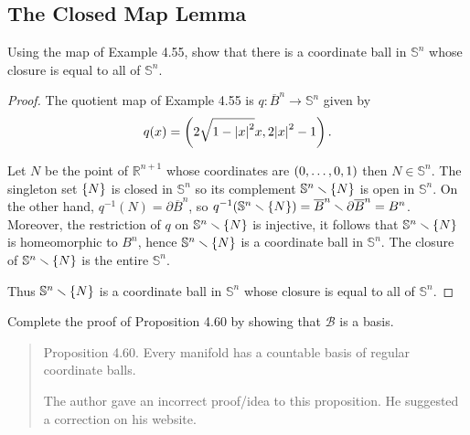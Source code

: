 \subsection*{The Closed Map Lemma}

\begin{exercise}{4.58}
	Using the map of Example 4.55, show that there is a coordinate ball in $\mathbb{S}^{n}$ whose closure is equal to all of $\mathbb{S}^{n}$.
\end{exercise}

\begin{proof}
	The quotient map of Example 4.55 is $q: {\overline{B}}^{n} \to \mathbb{S}^{n}$ given by
	\begin{equation*}
		q(x) = \left({2\sqrt{1 - {\left\vert{x}\right\vert}^{2}}x, 2{\left\vert{x}\right\vert}^{2} - 1}\right).
	\end{equation*}

	Let $N$ be the point of $\mathbb{R}^{n+1}$ whose coordinates are $\left({0, \ldots, 0, 1}\right)$ then $N\in \mathbb{S}^{n}$. The singleton set $\left\{{N}\right\}$ is closed in $\mathbb{S}^{n}$ so its complement $\mathbb{S}^{n}\smallsetminus \left\{{N}\right\}$ is open in $\mathbb{S}^{n}$. On the other hand, $q^{-1}(N) = \partial{\overline{B}}^{n}$, so $q^{-1}(\mathbb{S}^{n}\smallsetminus \left\{{N}\right\}) = {\overline{B}}^{n} \smallsetminus \partial{\overline{B}}^{n} = B^{n}$. Moreover, the restriction of $q$ on $\mathbb{S}^{n}\smallsetminus \left\{{N}\right\}$ is injective, it follows that $\mathbb{S}^{n}\smallsetminus \left\{{N}\right\}$ is homeomorphic to $B^{n}$, hence $\mathbb{S}^{n}\smallsetminus \left\{{N}\right\}$ is a coordinate ball in $\mathbb{S}^{n}$. The closure of $\mathbb{S}^{n}\smallsetminus \left\{{N}\right\}$ is the entire $\mathbb{S}^{n}$.

	Thus $\mathbb{S}^{n}\smallsetminus \left\{{N}\right\}$ is a coordinate ball in $\mathbb{S}^{n}$ whose closure is equal to all of $\mathbb{S}^{n}$.
\end{proof}

\begin{exercise}{4.61}\label{exercise:4.61}
	Complete the proof of Proposition 4.60 by showing that $\mathscr{B}$ is a basis.
\end{exercise}

\begin{quotation}
	Proposition 4.60. Every manifold has a countable basis of regular coordinate balls.

	The author gave an incorrect proof/idea to this proposition. He suggested a correction on his website.
\end{quotation}

